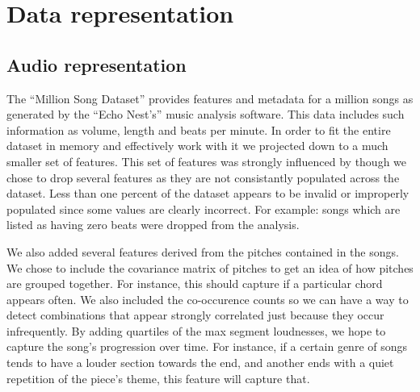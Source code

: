 \documentclass[a4paper,10pt]{article}
\begin{document}
\section{Data representation}
\subsection{Audio representation}
The ``Million Song Dataset'' provides features and metadata for a million songs as generated by the ``Echo Nest's'' music analysis software. This data includes such information as volume, length and beats per minute. In order to fit the entire dataset in memory and effectively work with it we projected down to a much smaller set of features. This set of features was strongly influenced by \cite{Slaney_learninga} though we chose to drop several features as they are not consistantly populated across the dataset. Less than one percent of the dataset appears to be invalid or improperly populated since some values are clearly incorrect. For example: songs which are listed as having zero beats were dropped from the analysis. 

We also added several features derived from the pitches contained in the songs. We chose to include the covariance matrix of pitches to get an idea of how pitches are grouped together. For instance, this should capture if a particular chord appears often. We also included the co-occurence counts so we can have a way to detect combinations that appear strongly correlated just because they occur infrequently. By adding quartiles of the max segment loudnesses, we hope to capture the song's progression over time. For instance, if a certain genre of songs tends to have a louder section towards the end, and another ends with a quiet repetition of the piece's theme, this feature will capture that.
\end{document}
